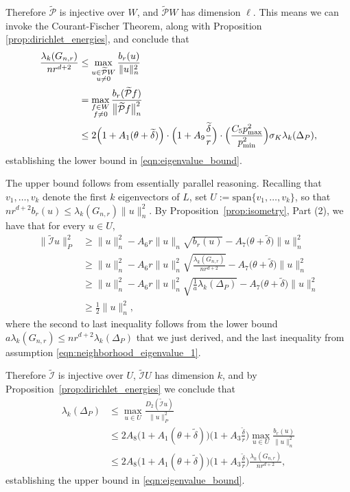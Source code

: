 \documentclass[twoside]{article}
\newcommand{\1}{\mathbf{1}}
\newcommand{\mc}[1]{\mathcal{#1}}
\newcommand{\wt}[1]{\widetilde{#1}}
\theoremstyle{definition}
\theoremstyle{remark}
\begin{document}
Therefore $\wt{\mc{P}}$ is injective over $W$, and $\wt{\mc{P}}W$ has dimension $\ell$. This means we can invoke the Courant-Fischer Theorem, along with Proposition \ref{prop:dirichlet_energies}, and conclude that
\begin{align*}
\frac{\lambda_k(G_{n,r})}{nr^{d + 2}} & \leq \max_{\substack{u \in \wt{\mc{P}}W \\ u \neq 0} } \frac{b_r(u)}{\|u\|_{n}^2} \\
& = \max_{\substack{f \in W \\ f \neq 0} } \frac{b_r(\wt{\mc{P}}f)}{\bigl\|\wt{\mc{P}}f\bigr\|_{n}^2} \\
& \leq 2\Bigl(1 + A_1(\theta + \wt{\delta})\Bigr) \cdot \Bigl(1 + A_9\frac{\wt{\delta}}{r}\Bigr) \cdot \Bigl(\frac{C_5 p_{\max}^2}{p_{\min}^2}\Bigr) \sigma_K \lambda_{k}(\Delta_P),
\end{align*}
establishing the lower bound in \eqref{eqn:eigenvalue_bound}.

The upper bound follows from essentially parallel reasoning. Recalling that $v_1,\ldots,v_k$ denote the first $k$ eigenvectors of $L$, set $U := \mathrm{span}\{v_1,\ldots,v_k\}$, so that $nr^{d + 2} b_r(u) \leq \lambda_k(G_{n,r}) \|u\|_n^2$. By Proposition~\ref{prop:isometry}, Part (2), we have that for every $u \in U$,
\begin{align*}
\bigl\|\wt{\mc{I}}u\bigr\|_{P}^2 & \geq \|u\|_n^2 - A_6 r \|u\|_n \sqrt{b_r(u)} - A_7\bigl(\theta + \wt{\delta}\bigr)\|u\|_n^2 \\
& \geq \|u\|_n^2 - A_6 r \|u\|_n^2 \sqrt{\frac{\lambda_{k}(G_{n,r})}{nr^{d + 2}}} - A_7\bigl(\theta + \wt{\delta}\bigr)\|u\|_n^2 \\
& \geq \|u\|_n^2 - A_6 r \|u\|_n^2 \sqrt{\frac{1}{a}\lambda_k(\Delta_P)} - A_7\bigl(\theta + \wt{\delta}\bigr)\|u\|_n^2 \\
& \geq \frac{1}{2}\|u\|_n^2,
\end{align*}
where the second to last inequality follows from the lower bound $a \lambda_k(G_{n,r}) \leq nr^{d + 2}\lambda_k(\Delta_P)$ that we just derived, and the last inequality from assumption \eqref{eqn:neighborhood_eigenvalue_1}.

Therefore $\wt{\mc{I}}$ is injective over $U$, $\wt{\mc{I}}U$ has dimension $k$, and by Proposition~\ref{prop:dirichlet_energies} we conclude that
\begin{align*}
\lambda_k(\Delta_P) & \leq \max_{u \in U} \frac{D_2(\wt{\mc{I}}u)}{\|u\|_P^2} \\
& \leq 2A_8\biggl(1 + A_1(\theta + \wt{\delta})\biggr) \biggl(1 + A_3 \frac{\wt{\delta}}{r}\biggr)\max_{u \in U} \frac{b_r(u)}{\|u\|_n^2} \\
& \leq 2A_8\biggl(1 + A_1(\theta + \wt{\delta})\biggr) \biggl(1 + A_3\frac{\wt{\delta}}{r}\biggr) \frac{\lambda_k(G_{n,r})}{nr^{d + 2}},
\end{align*}
establishing the upper bound in \eqref{eqn:eigenvalue_bound}.
\end{document}

